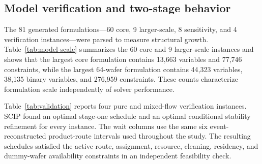 \documentclass[preprint,12pt,authoryear]{elsarticle}
\begin{document}
\subsection{Model verification and two-stage behavior}

The 81 generated formulations---60 core, 9 larger-scale, 8 sensitivity, and
4 verification instances---were parsed to measure structural growth.
Table~\ref{tab:model-scale} summarizes the 60 core and 9 larger-scale
instances and shows that the largest core formulation contains
13,663 variables and 77,746 constraints, while the largest 64-wafer
formulation contains 44,323 variables, 38,135 binary variables, and 276,959
constraints. These counts characterize formulation scale independently of
solver performance.

\begin{table}[htbp]
\centering
\caption{Structural scale of the generated two-stage MIPs.}
\label{tab:model-scale}
\end{table}

Table~\ref{tab:validation} reports four pure and mixed-flow verification
instances. SCIP found an optimal stage-one schedule and an optimal conditional
stability refinement for every instance. The wait columns use the same six
event-reconstructed product-route intervals used throughout the study. The
resulting schedules satisfied
the active route, assignment, resource, cleaning, residency, and dummy-wafer availability
constraints in an independent feasibility check.
\end{document}
